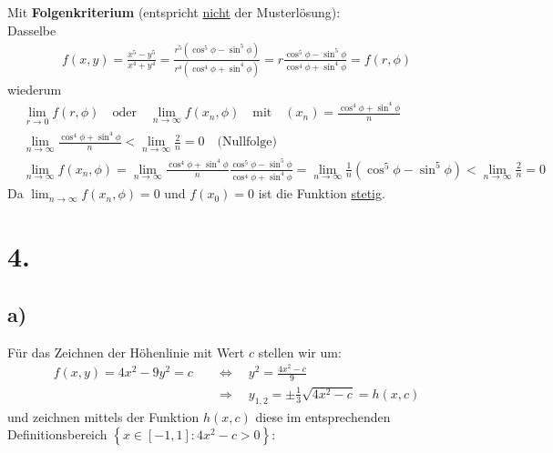 \documentclass[11pt,a4paper]{article}
\newcommand{\1}    	{\mathbbm{1}}
\begin{document}
	\noindent	
	Mit \textbf{Folgenkriterium} (entspricht \underline{nicht} der Musterlösung): \\
	Dasselbe
	\begin{align*}
		f(x,y) = \frac{x^5 - y^5}{x^4 + y^4} = \frac{r^5 ( \cos^5 \phi - \sin^5 \phi )}{r^4 ( \cos^4 \phi + \sin^4 \phi) } = r \frac{\cos^5 \phi - \sin^5 \phi}{\cos^4 \phi + \sin^4 \phi} = f(r,\phi)
	\end{align*}
	wiederum
	\begin{align*}
		& \lim_{r \rightarrow 0} f(r,\phi) \quad\textrm{oder}\quad
		\lim_{n \rightarrow \infty} f\left( x_n,\phi \right) \quad\textrm{mit}\quad
		(x_n) = \frac{\cos^4 \phi + \sin^4 \phi}{n} \\
		& \lim_{n \rightarrow \infty} \frac{\cos^4 \phi + \sin^4 \phi}{n} < \lim_{n \rightarrow \infty} \frac{2}{n} = 0 \quad \textrm{(Nullfolge)} \\
		& \lim_{n \rightarrow \infty} f\left( x_n,\phi \right)  = 
		\lim_{n \rightarrow \infty} \frac{\cos^4 \phi + \sin^4 \phi}{n} \frac{\cos^5 \phi - \sin^5 \phi}{\cos^4 \phi + \sin^4 \phi} = 
		\lim_{n \rightarrow \infty} \frac{1}{n} (\cos^5 \phi - \sin^5 \phi) < \lim_{n \rightarrow \infty} \frac{2}{n} = 0
	\end{align*}
	Da \( \lim_{n \rightarrow \infty} f\left( x_n,\phi \right) = 0\) und \(f( x_0) = 0\) ist die Funktion \underline{stetig}.
	
	\section*{4.}
	\subsection*{a)}
	Für das Zeichnen der Höhenlinie mit Wert \(c\) stellen wir um:
	\begin{align*}
		f(x,y) = 4x^2 - 9y^2 = c \quad &\Leftrightarrow \quad y^2 = \frac{4x^2 - c}{9} \\
		&\Rightarrow \quad y_{1,2} = \pm \frac{1}{3} \sqrt{4x^2 - c} = h(x,c)
	\end{align*}
	und zeichnen mittels der Funktion \(h(x,c)\) diese im entsprechenden Definitionsbereich \(\left\{ x \in \left[ -1, 1 \right] : 4x^2 - c > 0 \right\} \):
	
\end{document}
